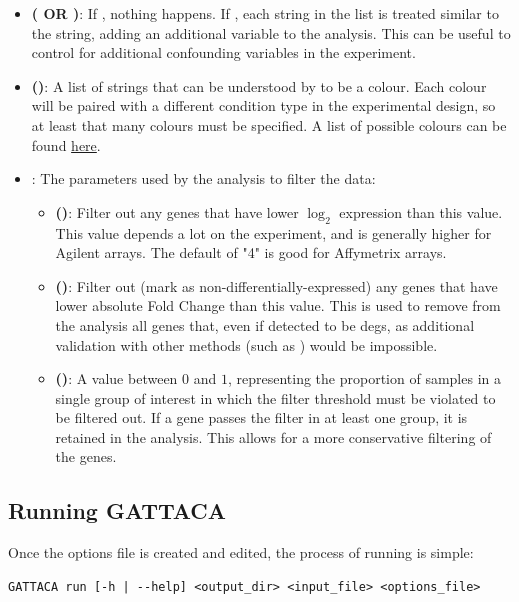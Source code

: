 \begin{itemize}
\begin{itemize}
        \item \textbf{ ( OR )}: If , nothing happens. If , each string in the list is treated similar to the  string, adding an additional variable to the  analysis. This can be useful to control for additional confounding variables in the experiment.
        \item \textbf{ ()}: A list of strings that can be understood by  to be a colour. Each colour will be paired with a different condition type in the experimental design, so at least that many colours must be specified. A list of possible colours can be found \href{http://www.stat.columbia.edu/~tzheng/files/Rcolor.pdf}{here}.
        \item \textbf{}: The parameters used by the analysis to filter the data:
        \begin{itemize}
            \item \textbf{ ()}: Filter out any genes that have lower $\log_2$ expression than this value. This value depends a lot on the experiment, and is generally higher for Agilent arrays. The default of "4" is good for Affymetrix arrays.
            \item \textbf{ ()}: Filter out (mark as non-differentially-expressed) any genes that have lower absolute Fold Change than this value. This is used to remove from the analysis all genes that, even if detected to be \glspl{deg}, as additional validation with other methods (such as ) would be impossible.
            \item \textbf{ ()}: A value between $0$ and $1$, representing the proportion of samples in a single group of interest in which the  filter threshold must be violated to be filtered out. If a gene passes the filter in at least one group, it is retained in the analysis. This allows for a more conservative filtering of the genes.
        \end{itemize}
    \end{itemize}
\end{itemize}

\subsection{Running GATTACA}
Once the options file is created and edited, the process of running  is simple:
\begin{lstlisting}[style=ShellStyle]
GATTACA run [-h | --help] <output_dir> <input_file> <options_file>
\end{lstlisting}

